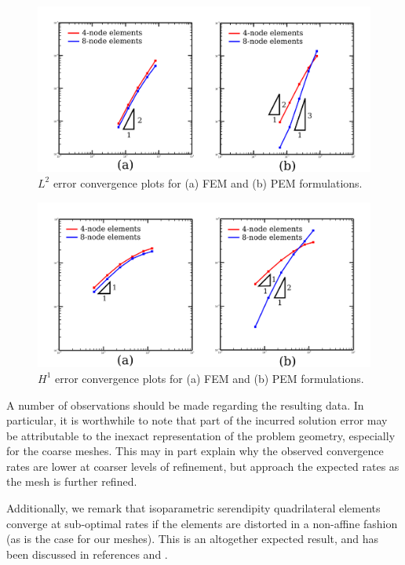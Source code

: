 \begin{figure}[!h]
  \centering
  \includegraphics[width=6.0in]{figures/l2_error_plot.pdf}
  \caption{$L^2$ error convergence plots for (a) FEM and (b) PEM formulations.}
  \label{fig:l2_error}
  \vspace{-10pt}
\end{figure}

\begin{figure}[!h]
  \centering
  \includegraphics[width=6.0in]{figures/h1_error_plot.pdf}
  \caption{$H^1$ error convergence plots for (a) FEM and (b) PEM formulations.}
  \label{fig:h1_error}
\end{figure}

A number of observations should be made regarding the resulting data. In particular, it is worthwhile to note that part of the incurred solution error may be attributable to the inexact representation of the problem geometry, especially for the coarse meshes. This may in part explain why the observed convergence rates are lower at coarser levels of refinement, but approach the expected rates as the mesh is further refined.

Additionally, we remark that isoparametric serendipity quadrilateral elements converge at sub-optimal rates if the elements are distorted in a non-affine fashion (as is the case for our meshes). This is an altogether expected result, and has been discussed in references \cite{Arnold:01} and \cite{Arnold:02}.

